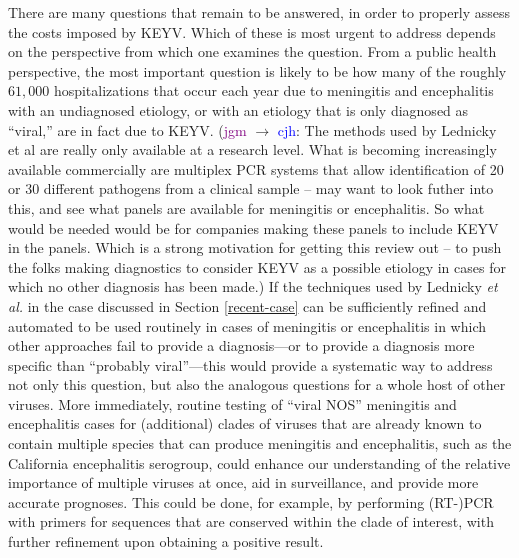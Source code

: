 \documentclass[12pt]{article}
\newcommand{\cjh}{\textcolor{blue}{cjh}}
\newcommand{\jgm}{\textcolor{purple}{jgm}}
\newcommand{\msg}[3]{(#1 $\rightarrow$ #2: #3)}
\newcommand{\mgc}[1]{\msg\jgm\cjh{#1}}
\begin{document}

        There are many questions that remain to be answered, in order to properly assess the costs imposed by KEYV. Which of these is most urgent to address depends on the perspective from which one examines the question. From a public health perspective, the most important question is likely to be how many of the roughly $61,000$ hospitalizations that occur each year due to meningitis and encephalitis with an undiagnosed etiology\cite{holmquist2008meningitis,george2014encephalitis}, or with an etiology that is only diagnosed as ``viral,'' are in fact due to KEYV. \mgc{The methods used by Lednicky et al are really only available at a research level.  What is becoming increasingly available commercially are multiplex PCR systems that allow identification of 20 or 30 different pathogens from a clinical sample – may want to look futher into this, and see what panels are available for meningitis or encephalitis.  So what would be needed would be for companies making these panels to include KEYV in the panels.  Which is a strong motivation for getting this review out – to push the folks making diagnostics to consider KEYV as a possible etiology in cases for which no other diagnosis has been made.} If the techniques used by Lednicky \textit{et al.}\cite{lednicky2018keystone} in the case discussed in Section \ref{recent-case} can be sufficiently refined and automated to be used routinely in cases of meningitis or encephalitis in which other approaches fail to provide a diagnosis---or to provide a diagnosis more specific than ``probably viral''---this would provide a systematic way to address not only this question, but also the analogous questions for a whole host of other viruses. More immediately, routine testing of ``viral NOS'' meningitis and encephalitis cases for (additional) clades of viruses that are already known to contain multiple species that can produce meningitis and encephalitis, such as the California encephalitis serogroup, could enhance our understanding of the relative importance of multiple viruses at once, aid in surveillance, and provide more accurate prognoses. This could be done, for example, by performing (RT-)PCR with primers for sequences that are conserved within the clade of interest, with further refinement upon obtaining a positive result.
\end{document}
